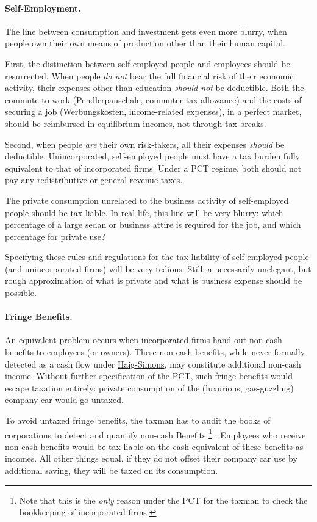 \paragraph{Self-Employment.}
The line between consumption and investment gets even more blurry, when people own their own means of production other than their human capital.

First, the distinction between self-employed people and employees should be resurrected.
When people \emph{do not} bear the full financial risk of their economic activity, their expenses other than education \emph{should not} be deductible.
Both the commute to work (Pendlerpauschale, commuter tax allowance) and the costs of securing a job (Werbungskosten, income-related expenses), in a perfect market, should be reimbursed in equilibrium incomes, not through tax breaks.

Second, when people \emph{are} their own risk-takers, all their expenses \emph{should} be deductible.
Unincorporated, self-employed people must have a tax burden fully equivalent to that of incorporated firms.
Under a PCT regime, both should not pay any redistributive or general revenue taxes.

The private consumption unrelated to the business activity of self-employed people should be tax liable.
In real life, this line will be very blurry:
which percentage of a large sedan or business attire is required for the job, and which percentage for private use?

Specifying these rules and regulations for the tax liability of self-employed people (and unincorporated firms) will be very tedious.
Still, a necessarily unelegant, but rough approximation of what is private and what is business expense should be possible.

\paragraph{Fringe Benefits.}
An equivalent problem occurs when incorporated firms hand out non-cash benefits to employees (or owners).
These non-cash benefits, while never formally detected as a cash flow under \hyperref[eq:HaigSimonsPCT]{Haig-Simons}, may constitute additional non-cash income.
Without further specification of the PCT, such fringe benefits would escape taxation entirely:
private consumption of the (luxurious, gas-guzzling) company car would go untaxed.

To avoid untaxed fringe benefits, the taxman has to audit the books of corporations to detect and quantify non-cash Benefits
\footnote{
	Note that this is the \emph{only} reason under the PCT for the taxman to check the bookkeeping of incorporated firms.
}
.
Employees who receive non-cash benefits would be tax liable on the cash equivalent of these benefits as incomes.
All other things equal, if they do not offset their company car use by additional saving, they will be taxed on its consumption.

